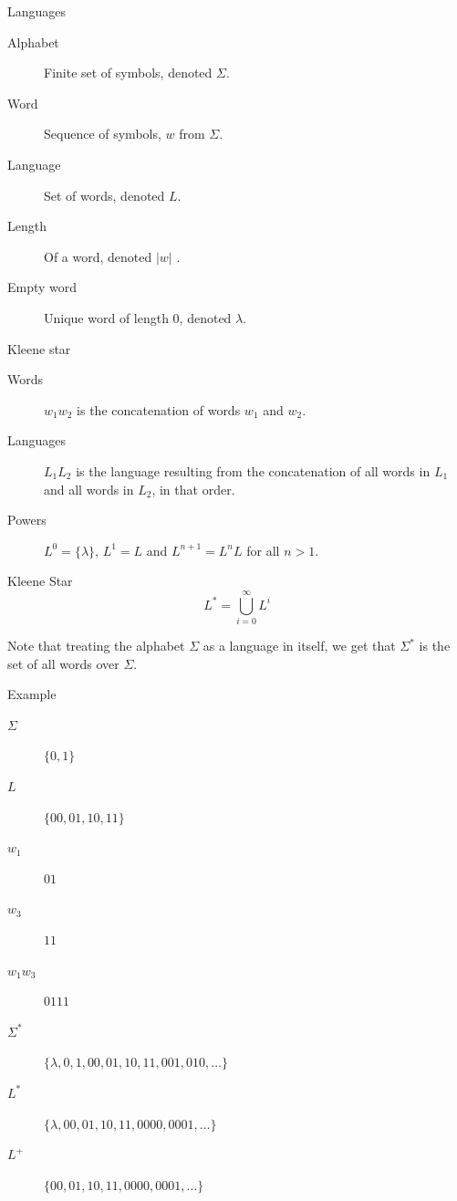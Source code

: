 \begin{frame}{Languages}
  \begin{description}
    \item[Alphabet] Finite set of symbols, denoted $\Sigma$.
    \item[Word] Sequence of symbols, $w$ from $\Sigma$.
    \item[Language] Set of words, denoted $L$.
    \item[Length] Of a word, denoted $|w|$  .
    \item[Empty word] Unique word of length 0, denoted $\lambda$.
  \end{description}
\end{frame}

\begin{frame}{Kleene star}
  \begin{description}
    \item[Words] $w_1 w_2$ is the concatenation of words $w_1$ and $w_2$.
    \item[Languages] $L_1 L_2$ is the language resulting from the concatenation of all words in $L_1$ and all words in $L_2$, in that order.
    \item[Powers] $L^0 = \{ \lambda \}$, $L^1 = L$ and $L^{n+1} = L^n L$ for all $n > 1$.
  \end{description}
  
  \vspace{0.5cm}
  
  \begin{block}{Kleene Star}
     \[ L^* =  \bigcup_{i=0}^{\infty} L^i \]
  \end{block}
  
  Note that treating the alphabet $\Sigma$ as a language in itself, we get that $\Sigma^*$ is the set of all words over $\Sigma$.
\end{frame}

\begin{frame}{Example}
  \begin{description}
    \item[$\Sigma$] $\{ 0, 1 \}$
    \item[$L$] $\{ 00, 01, 10, 11 \}$
    \item[$w_1$] $01$
    \item[$w_3$] $11$
    \item[$w_1 w_3$] $0111$
    \item[$\Sigma^*$] $\{ \lambda, 0, 1, 00, 01, 10, 11, 001, 010, \ldots \}$
    \item[$L^*$] $\{ \lambda, 00, 01, 10, 11, 0000, 0001, \ldots \}$
    \item[$L^+$] $\{ 00, 01, 10, 11, 0000, 0001, \ldots \}$
  \end{description}
\end{frame}

